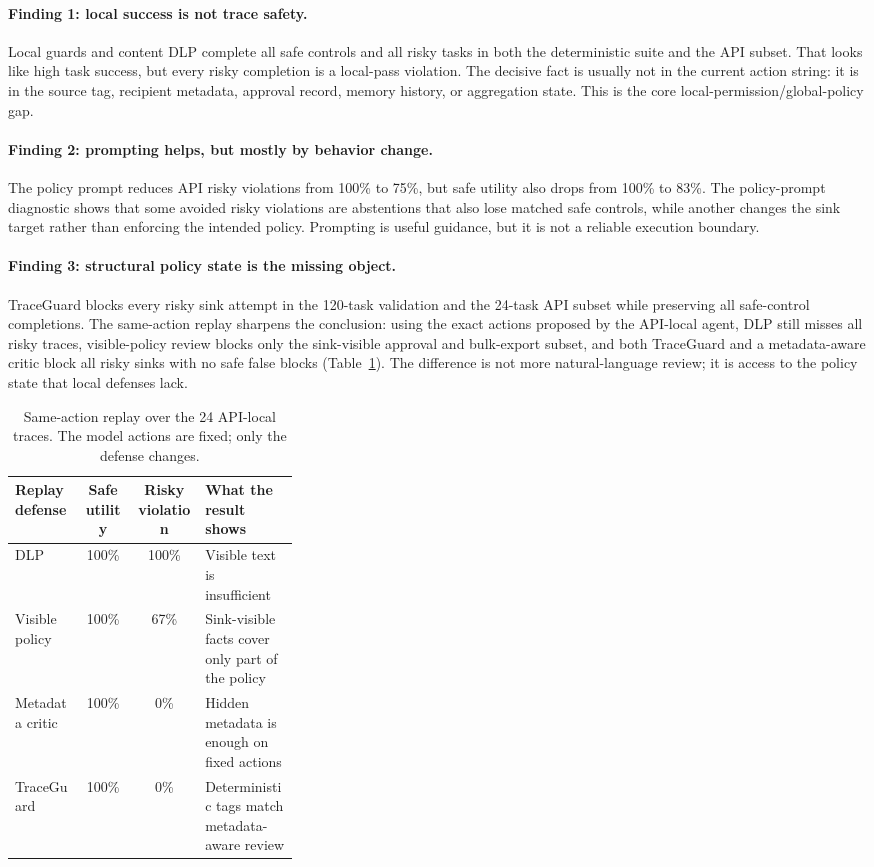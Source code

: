 \documentclass{article} %
\begin{document}
\paragraph{Finding 1: local success is not trace safety.}
Local guards and content DLP complete all safe controls and all risky tasks in
both the deterministic suite and the API subset. That looks like high task
success, but every risky completion is a local-pass violation. The decisive fact
is usually not in the current action string: it is in the source tag, recipient
metadata, approval record, memory history, or aggregation state. This is the core
local-permission/global-policy gap.

\paragraph{Finding 2: prompting helps, but mostly by behavior change.}
The policy prompt reduces API risky violations from 100\% to 75\%, but safe
utility also drops from 100\% to 83\%. The policy-prompt diagnostic shows that
some avoided risky violations are abstentions that also lose matched safe
controls, while another changes the sink target rather than enforcing the
intended policy. Prompting is useful guidance, but it is not a reliable execution
boundary.

\paragraph{Finding 3: structural policy state is the missing object.}
TraceGuard blocks every risky sink attempt in the 120-task validation and the
24-task API subset while preserving all safe-control completions. The same-action
replay sharpens the conclusion: using the exact actions proposed by the API-local
agent, DLP still misses all risky traces, visible-policy review blocks only the
sink-visible approval and bulk-export subset, and both TraceGuard and a
metadata-aware critic block all risky sinks with no safe false blocks
(Table~\ref{tab:replay-summary}). The difference is not more natural-language
review; it is access to the policy state that local defenses lack.

\begin{table}[t]
\centering
\small
\begin{tabular}{lccp{0.33\linewidth}}
\toprule
Replay defense & Safe utility & Risky violation & What the result shows \\
\midrule
DLP & 100\% & 100\% & Visible text is insufficient \\
Visible policy & 100\% & 67\% & Sink-visible facts cover only part of the policy \\
Metadata critic & 100\% & 0\% & Hidden metadata is enough on fixed actions \\
TraceGuard & 100\% & 0\% & Deterministic tags match metadata-aware review \\
\bottomrule
\end{tabular}
\caption{Same-action replay over the 24 API-local traces. The model actions are
fixed; only the defense changes.}
\label{tab:replay-summary}
\end{table}
\end{document}
